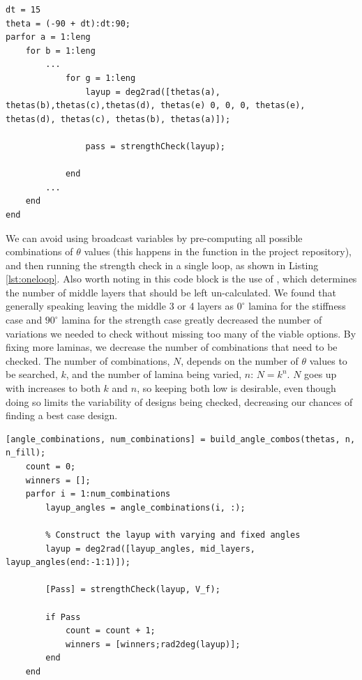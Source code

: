 \documentclass[12pt]{article}
\begin{document}
\begin{lstlisting}[label=lst:broadcast,caption=\mcode{parfor} loop with a broadcast variable]
dt = 15
theta = (-90 + dt):dt:90; 
parfor a = 1:leng
    for b = 1:leng
        ...
            for g = 1:leng
                layup = deg2rad([thetas(a), thetas(b),thetas(c),thetas(d), thetas(e) 0, 0, 0, thetas(e), thetas(d), thetas(c), thetas(b), thetas(a)]);
                
                pass = strengthCheck(layup);

            end
        ...          
    end
end
\end{lstlisting}

We can avoid using broadcast variables by pre-computing all possible combinations of $\theta$ values (this happens in the  function in the project repository), and then running the strength check in a single  loop, as shown in Listing \ref{lst:oneloop}. Also worth noting in this code block is the use of , which determines the number of middle layers that should be left un-calculated. We found that generally speaking leaving the middle 3 or 4 layers as $0^\circ$ lamina for the stiffness case and $90^\circ$ lamina for the strength case greatly decreased the number of variations we needed to check without missing too many of the viable options. By fixing more laminas, we decrease the number of combinations that need to be checked. The number of combinations, $N$, depends on the number of $\theta$ values to be searched, $k$, and the number of lamina being varied, $n$: $N = k^n$. $N$ goes up  with increases to both $k$ and $n$, so keeping both low is desirable, even though doing so limits the variability of designs being checked, decreasing our chances of finding a best case design.


\begin{lstlisting}[label=lst:oneloop,caption=\mcode{parfor} loop with precomputed angle combinations]
    [angle_combinations, num_combinations] = build_angle_combos(thetas, n, n_fill);
    count = 0;
    winners = [];
    parfor i = 1:num_combinations
        layup_angles = angle_combinations(i, :);
    
        % Construct the layup with varying and fixed angles
        layup = deg2rad([layup_angles, mid_layers, layup_angles(end:-1:1)]);
    
        [Pass] = strengthCheck(layup, V_f);

        if Pass
            count = count + 1;
            winners = [winners;rad2deg(layup)];
        end
    end
\end{lstlisting}
\end{document}

